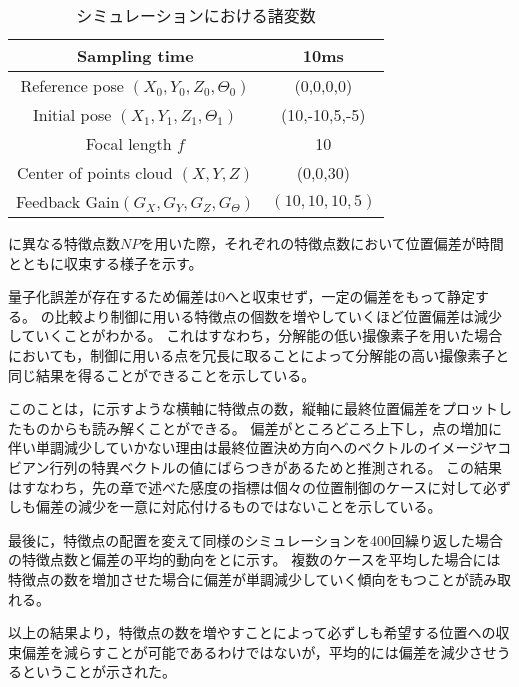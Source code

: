 \documentclass[fleqn]{jreport}
\begin{document}
\begin{table}[!t]
	\begin{center}
		\begin{tabular}{c|c} \hline \hline
			Sampling time& 10ms\\ \hline
			Reference pose $(X_0,Y_0,Z_0,\Theta_0)$ & (0,0,0,0) \\ \hline
			Initial pose $(X_1,Y_1,Z_1,\Theta_1)$ & (10,-10,5,-5) \\\hline
			Focal length $f$ & 10 \\\hline
			Center of points cloud $(X,Y,Z)$ & (0,0,30) \\\hline
			Feedback Gain$(G_X,G_Y,G_Z,G_\Theta)$ & $(10,10,10,5)$\\ \hline \hline
		\end{tabular}
		\caption{シミュレーションにおける諸変数}
		\label{tb:冗長}
	\end{center}
\end{table}


に異なる特徴点数$NP$を用いた際，それぞれの特徴点数において位置偏差が時間とともに収束する様子を示す。

量子化誤差が存在するため偏差は0へと収束せず，一定の偏差をもって静定する。
の比較より制御に用いる特徴点の個数を増やしていくほど位置偏差は減少していくことがわかる。
これはすなわち，分解能の低い撮像素子を用いた場合においても，制御に用いる点を冗長に取ることによって分解能の高い撮像素子と同じ結果を得ることができることを示している。

このことは，に示すような横軸に特徴点の数，縦軸に最終位置偏差をプロットしたものからも読み解くことができる。
偏差がところどころ上下し，点の増加に伴い単調減少していかない理由は最終位置決め方向へのベクトルのイメージヤコビアン行列の特異ベクトルの値にばらつきがあるためと推測される。
この結果はすなわち，先の章で述べた感度の指標は個々の位置制御のケースに対して必ずしも偏差の減少を一意に対応付けるものではないことを示している。


最後に，特徴点の配置を変えて同様のシミュレーションを400回繰り返した場合の特徴点数と偏差の平均的動向をとに示す。
複数のケースを平均した場合には特徴点の数を増加させた場合に偏差が単調減少していく傾向をもつことが読み取れる。



以上の結果より，特徴点の数を増やすことによって必ずしも希望する位置への収束偏差を減らすことが可能であるわけではないが，平均的には偏差を減少させうるということが示された。
\end{document}

